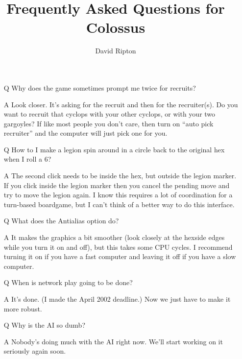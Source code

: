 \documentclass{article}
\begin{document}

\title{Frequently Asked Questions for Colossus}

\author{David Ripton}

\maketitle

\begin{itemize}

\item[Q] Why does the game sometimes prompt me twice for recruits?

\item[A] Look closer. It's asking for the recruit and then for the recruiter(s).
 Do you want to recruit that cyclops with your other cyclops, or with
 your two gargoyles? If like most people you don't care, then turn on 
 ``auto pick recruiter'' and the computer will just pick one for you.


\item[Q] How to I make a legion spin around in a circle back to the original
 hex when I roll a 6? 

\item[A] The second click needs to be inside the hex, but outside the legion 
 marker. If you click inside the legion marker then you cancel the
 pending move and try to move the legion again. I know this requires
 a lot of coordination for a turn-based boardgame, but I can't think
 of a better way to do this interface.


\item[Q] What does the Antialias option do?

\item[A] It makes the graphics a bit smoother (look closely at the hexside edges
 while you turn it on and off), but this takes some CPU cycles. I
 recommend turning it on if you have a fast computer and leaving it off
 if you have a slow computer. 


\item[Q] When is network play going to be done?

\item[A] It's done.  (I made the April 2002 deadline.)  Now we just have to make it more robust.


\item[Q] Why is the AI so dumb?

\item[A] Nobody's doing much with the AI right now.  We'll start working
 on it seriously again soon.



\end{itemize}
\end{document}
